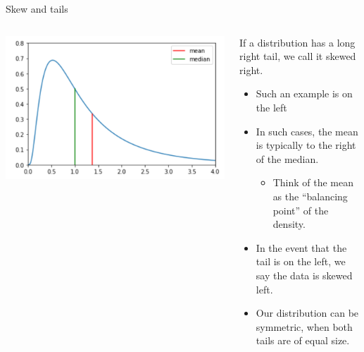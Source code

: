 \documentclass[aspectratio=169]{../latex_main/tntbeamer}  %
\begin{document}
    
    \begin{frame}{Skew and tails}
        \begin{columns}
            \begin{column}{.5\textwidth}
            
                       \centering
                       \includegraphics[scale=.5]{Bild35}

            \end{column}
            
            
            \begin{column}{.4\textwidth}
                   If a distribution has a long right tail, we call it skewed right.
                   \begin{itemize}
                       \item Such an example is on the left
                       \item In such cases, the mean is typically to the right of the median.
                       \begin{itemize}
                           \item Think of the mean as the “balancing point” of the density.
                       \end{itemize}
                       \item In the event that the tail is on the left, we say the data is skewed left.
                       \item Our distribution can be symmetric, when both tails are of equal size.
                   \end{itemize}
            \end{column}
        \end{columns}
    \end{frame}
    
\end{document}
